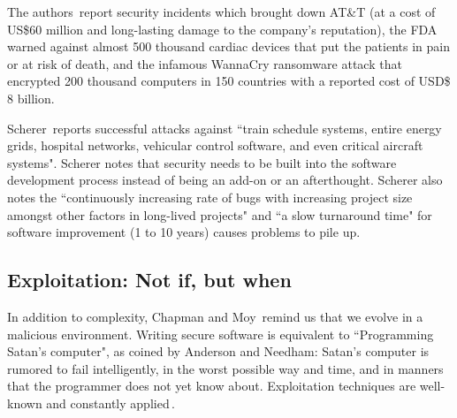 \documentclass[nomenclature, english, bibtex]{kththesis}
\begin{document}

The authors\,\cite{moy_when_2020} report security incidents which brought down AT\&T (at a cost of US\$60 million and long-lasting damage to the company's reputation), the \gls{FDA} warned against almost 500 thousand cardiac devices that put the patients in pain or at risk of death, and the infamous WannaCry ransomware attack that encrypted 200 thousand computers in 150 countries with a reported cost of USD\$ 8 billion.

Scherer\,\cite{scherer_engineering_2021} reports successful attacks against ``train schedule systems, entire energy grids, hospital networks, vehicular control software, and even critical aircraft systems". Scherer notes that security needs to be built into the software development process instead of being an add-on or an afterthought. Scherer also notes the ``continuously increasing rate of bugs with increasing project size amongst other factors in long-lived projects" and ``a slow turnaround time" for software improvement (1 to 10 years) causes problems to pile up.

\subsection{Exploitation: Not if, but when}
\label{sec:exploitationwhen}

In addition to complexity, Chapman and Moy\,\cite{chapman_adacore_2018} remind us that we evolve in a malicious environment. Writing secure software is equivalent to ``Programming Satan’s computer", as coined by Anderson and Needham: Satan’s computer is rumored to fail intelligently, in the worst possible way and time, and in manners that the programmer does not yet know about. Exploitation techniques are well-known and constantly applied\,\cite{pal_memory_2016}.
\end{document}
